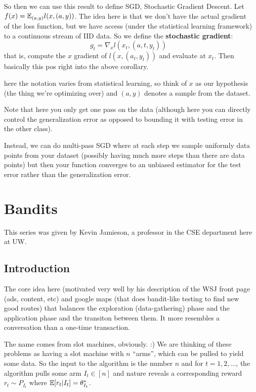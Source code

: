 \documentclass[12pt]{article}
\begin{document}
So then we can use this result to define SGD, Stochastic Gradient Descent. Let $f(x)=\mathbb{E}_{(a,y)}l(x,(a,y))$.
The idea here is that we don't have the actual gradient of the loss function, but we have access (under the statistical learning framework) to a continuous stream of IID data.
So we define the \textbf{stochastic gradient}:
\[g_t=\nabla_x l(x_t,(a,t,y_t))\]
that is, compute the $x$ gradient of $l(x,(a_t,y_t))$ and evaluate at $x_t$. Then basically this pos right into the above corollary.

\begin{rmk}
	here the notation varies from statistical learning, so think of $x$ as our hypothesis (the thing we're optimizing over) and $(a,y)$ denotes a sample from the dataset.
\end{rmk}

Note that here you only get one pass on the data (although here you can directly control the generalization error as opposed to bounding it with testing error in the other class).

Instead, we can do multi-pass SGD where at each step we sample uniformly data points from your dataset (possibly having much more steps than there are data points) but then your function converges to an unbiased estimator for the test error rather than the generalization error.



\section{Bandits}
This series was given by Kevin Jamieson, a professor in the CSE department here at UW.

\subsection{Introduction}
The core idea here (motivated very well by his description of the WSJ front page (ads, content, etc) and google maps (that does bandit-like testing to find new good routes) that balances
the exploration (data-gathering) phase and the application phase and the transiton between them. It more resembles a conversation than a one-time transaction.

The name comes from slot machines, obviously. :) We are thinking of these problems as having a slot machine with $n$ ``arms'', which can be pulled to yield some data.
So the input to the algorithm is the number $n$ and for $t=1,2,\dots$, the algorithm pulls some arm $I_t\in[n]$ and nature reveals a corresponding reward $r_t\sim P_{I_t}$ where 
$\mathbb{E}[r_t|I_t]=\theta_{I_t}^\ast$.
\end{document}

